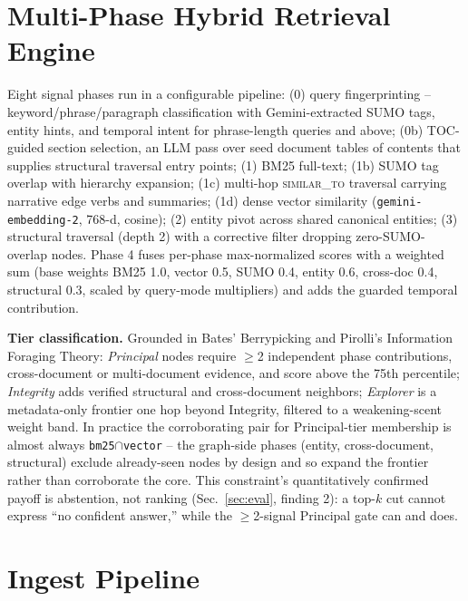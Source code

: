 \documentclass[conference,a4paper]{IEEEtran}
\begin{document}
\section{Multi-Phase Hybrid Retrieval Engine}

Eight signal phases run in a configurable pipeline: (0) query fingerprinting -- keyword/phrase/paragraph classification with Gemini-extracted SUMO tags, entity hints, and temporal intent for phrase-length queries and above; (0b) TOC-guided section selection, an LLM pass over seed document tables of contents that supplies structural traversal entry points; (1) BM25 full-text; (1b) SUMO tag overlap with hierarchy expansion; (1c) multi-hop \textsc{similar\_to} traversal carrying narrative edge verbs and summaries; (1d) dense vector similarity (\texttt{gemini-embedding-2}, 768-d, cosine); (2) entity pivot across shared canonical entities; (3) structural traversal (depth 2) with a corrective filter dropping zero-SUMO-overlap nodes. Phase 4 fuses per-phase max-normalized scores with a weighted sum (base weights BM25 1.0, vector 0.5, SUMO 0.4, entity 0.6, cross-doc 0.4, structural 0.3, scaled by query-mode multipliers) and adds the guarded temporal contribution.

\textbf{Tier classification.} Grounded in Bates' Berrypicking and Pirolli's Information Foraging Theory: \emph{Principal} nodes require $\geq$2 independent phase contributions, cross-document or multi-document evidence, and score above the 75th percentile; \emph{Integrity} adds verified structural and cross-document neighbors; \emph{Explorer} is a metadata-only frontier one hop beyond Integrity, filtered to a weakening-scent weight band. In practice the corroborating pair for Principal-tier membership is almost always \texttt{bm25}$\cap$\texttt{vector} -- the graph-side phases (entity, cross-document, structural) exclude already-seen nodes by design and so expand the frontier rather than corroborate the core. This constraint's quantitatively confirmed payoff is abstention, not ranking (Sec.~\ref{sec:eval}, finding 2): a top-$k$ cut cannot express ``no confident answer,'' while the $\geq$2-signal Principal gate can and does.

\section{Ingest Pipeline}
\end{document}
